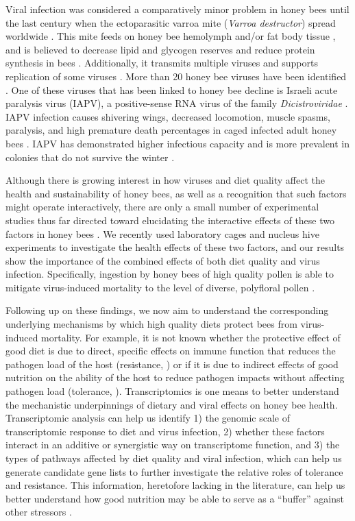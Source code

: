 \documentclass{bmcart}
\begin{document}
\begin{linenumbers}
\begin{doublespacing}
Viral infection was considered a comparatively minor problem in honey bees until the last century when the ectoparasitic varroa mite (\textit{Varroa destructor}) spread worldwide \cite{miteProblem, miteProblem2, miteProblem3}. This mite feeds on honey bee hemolymph and/or fat body tissue \cite{hemolymph, fatbody}, and is believed to decrease lipid and glycogen reserves and reduce protein synthesis in bees \cite{miteNutrition}. Additionally, it transmits multiple viruses and supports replication of some viruses \cite{miteVirus, miteVirus2, miteVirus3, newVR}. More than 20 honey bee viruses have been identified \cite{numVirus}. One of these viruses that has been linked to honey bee decline is Israeli acute paralysis virus (IAPV), a positive-sense RNA virus of the family \textit{Dicistroviridae} \cite{fam}. IAPV infection causes shivering wings, decreased locomotion, muscle spasms, paralysis, and high premature death percentages in caged infected adult honey bees \cite{symptoms}. IAPV has demonstrated higher infectious capacity \cite{carrillo} and is more prevalent in colonies that do not survive the winter \cite{winter}.

Although there is growing interest in how viruses and diet quality affect the health and sustainability of honey bees, as well as a recognition that such factors might operate interactively, there are only a small number of experimental studies thus far directed toward elucidating the interactive effects of these two factors in honey bees \cite{intNV, intNV2, intNV3, interactingDV, interactingDV2}. We recently used laboratory cages and nucleus hive experiments to investigate the health effects of these two factors, and our results show the importance of the combined effects of both diet quality and virus infection. Specifically, ingestion by honey bees of high quality pollen is able to mitigate virus-induced mortality to the level of diverse, polyfloral pollen \cite{adamInt}. 

Following up on these findings, we now aim to understand the corresponding underlying mechanisms by which high quality diets protect bees from virus-induced mortality. For example, it is not known whether the protective effect of good diet is due to direct, specific effects on immune function that reduces the pathogen load of the host (resistance, \cite{Medzhitov}) or if it is due to indirect effects of good nutrition on the ability of the host to reduce pathogen impacts without affecting pathogen load (tolerance, \cite{Medzhitov}). Transcriptomics is one means to better understand the mechanistic underpinnings of dietary and viral effects on honey bee health. Transcriptomic analysis can help us identify 1) the genomic scale of transcriptomic response to diet and virus infection, 2) whether these factors interact in an additive or synergistic way on transcriptome function, and 3) the types of pathways affected by diet quality and viral infection, which can help us generate candidate gene lists to further investigate the relative roles of tolerance and resistance. This information, heretofore lacking in the literature, can help us better understand how good nutrition may be able to serve as a ``buffer'' against other stressors \cite{AdamTothReview}.


\end{doublespacing}
\end{linenumbers}
\end{document}

